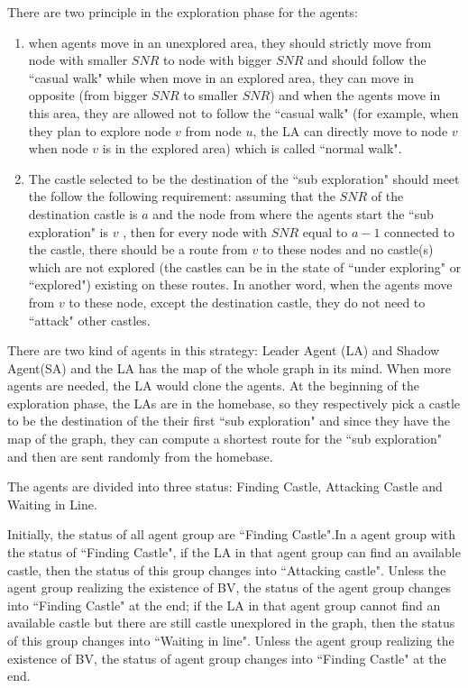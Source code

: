 There are two principle in the exploration phase for the agents:
\begin{enumerate}
\item when agents move in an unexplored area, they should strictly move from node with smaller $SNR$ to node with bigger $SNR$ and should follow the ``casual walk" while when move in an explored area, they can move in opposite (from bigger $SNR$ to smaller $SNR$) and when the agents move in this area, they are allowed not to follow the ``casual walk" (for example, when they plan to explore node $v$ from node $u$, the LA can directly move to node $v$ when node $v$ is in the explored area) which is called ``normal walk".
\item The castle selected to be the destination of the ``sub exploration" should meet the follow the following requirement: assuming that the $SNR$ of the destination castle is $a$ and the node from where the agents start the ``sub exploration" is $v$  , then for every node with $SNR$ equal to $a-1$ connected to the castle, there should be a route from $v$ to these nodes and no castle(s) which are not explored (the castles can be in the state of ``under exploring" or ``explored") existing on these routes. In another word, when the agents move from $v$ to these node, except the destination castle, they do not need to ``attack" other castles. 
\end{enumerate}  

There are two kind of agents in this strategy: Leader Agent (LA) and Shadow Agent(SA) and the LA has the map of the whole graph in its mind. When more agents are needed, the LA would clone the agents. At the beginning of the exploration phase, the LAs are in the homebase, so they respectively pick a castle to be the destination of the their first ``sub exploration" and since they have the map of the graph, they can compute a shortest route for the ``sub exploration" and then are sent randomly from the homebase. 

The agents are divided into three status: Finding Castle, Attacking Castle and Waiting in Line. 

Initially, the status of all agent group are ``Finding Castle".In a agent group with the status of ``Finding Castle", if the LA in that agent group can find an available castle, then the status of this group changes into ``Attacking castle". Unless the agent group realizing the existence of BV, the status of the agent group changes into ``Finding Castle" at the end; if the LA in that agent group cannot find an available castle but there are still castle unexplored in the graph, then the status of this group changes into ``Waiting in line". Unless the agent group realizing the existence of BV, the status of agent group changes into ``Finding Castle" at the end. 

